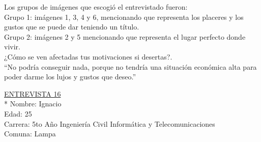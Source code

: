 Los grupos de imágenes que escogió el entrevistado fueron:\\

Grupo 1: imágenes 1, 3, 4 y 6, mencionando que representa los placeres y los gustos que se puede dar teniendo un título. \\

Grupo 2: imágenes 2 y 5 mencionando que representa el lugar perfecto donde vivir.\\


¿Cómo se ven afectadas tus motivaciones si desertas?.\\

``No podría conseguir nada, porque no tendría una situación económica alta para poder darme los lujos y gustos que deseo.''


\underline {ENTREVISTA 16}\\*
Nombre: Ignacio\\
Edad: 25\\
Carrera: 5to Año Ingeniería Civil Informática y Telecomunicaciones\\
Comuna: Lampa\\

